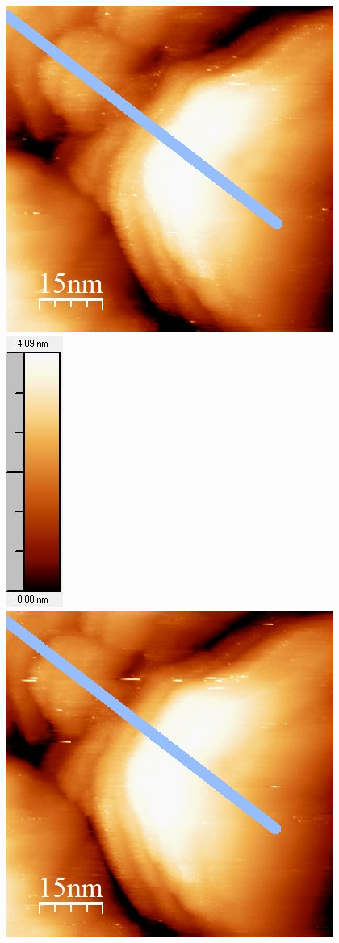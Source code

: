 \documentclass[12pt,a4paper]{article}
\begin{document}
\begin{figure}
\centering
\includegraphics[scale=0.6]{Bilder/Anhang/IGain/3000_IGain_vor.jpg}
\includegraphics[scale=0.6]{Bilder/Anhang/IGain/3000_IGain_vor_Skala.jpg}
\includegraphics[scale=0.6]{Bilder/Anhang/IGain/3000_IGain_nach.jpg}

\end{figure}
\end{document}
